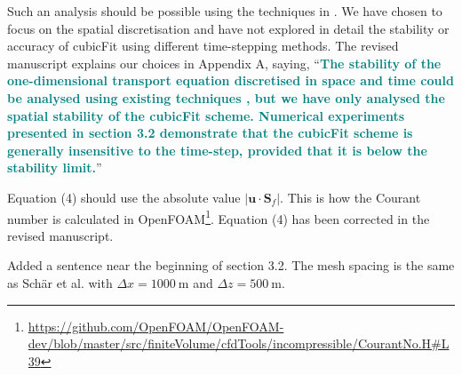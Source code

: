\documentclass[times]{elsarticle}
\newcommand{\revtwo}[1]{\textcolor{teal}{\textbf{#1}}}
\begin{document}
\begin{quotation}
\begin{comment}
\item Might it be possible to include the time discretization (2) in the stability analysis?
It would be interesting to know if the weak instability of (2) (noted on p3) affects
the constraints (57), (58), (63).
\end{comment}
\end{quotation}
Such an analysis should be possible using the techniques in \citep{baldauf2008}.  We have chosen to focus on the spatial discretisation and have not explored in detail the stability or accuracy of cubicFit using different time-stepping methods.  The revised manuscript explains our choices in Appendix A, saying, ``\revtwo{The stability of the one-dimensional transport equation discretised in space and time could be analysed using existing techniques \citep{baldauf2008}, but we have only analysed the spatial stability of the cubicFit scheme.  Numerical experiments presented in section 3.2 demonstrate that the cubicFit scheme is generally insensitive to the time-step, provided that it is below the stability limit.}''

\begin{quotation}
\begin{comment}
\item The Courant number as defined by (4) would appear to vanish for a non-divergent
flow. A more natural definition might be to sum only over outflow faces (and
remove the factor $1/2$). For non-divergent flow that would be equivalent to
replacing $\mathbf{u} \cdot \mathbf{S}_f$ by $| \mathbf{u} \cdot \mathbf{S}_f |$
in~(4).
\end{comment}
\end{quotation}
Equation (4) should use the absolute value $\lvert \mathbf{u} \cdot \mathbf{S}_f \rvert$.  This is how the Courant number is calculated in OpenFOAM\footnote{\url{https://github.com/OpenFOAM/OpenFOAM-dev/blob/master/src/finiteVolume/cfdTools/incompressible/CourantNo.H\#L39}}.  Equation (4) has been corrected in the revised manuscript.

\begin{quotation}
\begin{comment}
\item Section 3.2 and Table~1: what resolution is used?
\end{comment}
\end{quotation}
Added a sentence near the beginning of section 3.2.  The mesh spacing is the same as Sch\"ar et al. \citep{schaer2002} with $\Delta x = \SI{1000}{\meter}$ and $\Delta z = \SI{500}{\meter}$.
\end{document}
